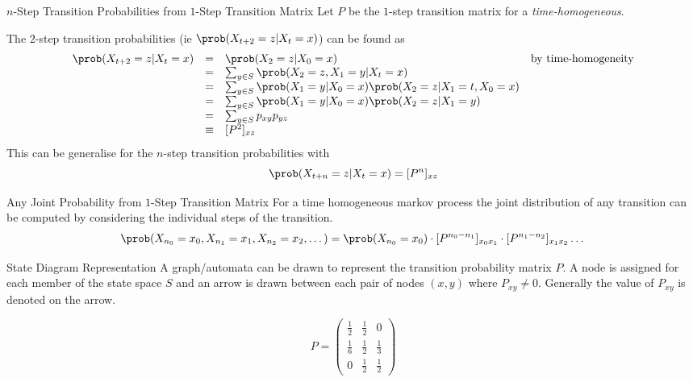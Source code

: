 \documentclass[11pt,a4paper]{article}
\begin{document}
\begin{proposition}{$n$-Step Transition Probabilities from $1$-Step Transition Matrix}
  Let $P$ be the $1$-step transition matrix for a \textit{time-homogeneous}.

  \par The $2$-step transition probabilities (ie $\prob(X_{t+2}=z|X_t=x)$) can be found as
  \[\begin{array}{rcll}
    \prob(X_{t+2}=z|X_t=x)&=&\prob(X_2=z|X_0=x)&\text{by time-homogeneity}\\
    &=&\sum_{y\in S}\prob(X_2=z,X_1=y|X_t=x)\\
    &=&\sum_{y\in S}\prob(X_1=y|X_0=x)\prob(X_2=z|X_1=t,X_0=x)\\
    &=&\sum_{y\in S}\prob(X_1=y|X_0=x)\prob(X_2=z|X_1=y)\\
    &=&\sum_{y\in S}p_{xy}p_{yz}\\
    &\equiv&[P^2]_{xz}
  \end{array}\]
  This can be generalise for the $n$-step transition probabilities with
  \[ \prob(X_{t+n}=z|X_t=x)=[P^n]_{xz} \]
\end{proposition}

\begin{proposition}{Any Joint Probability from $1$-Step Transition Matrix}
  For a time homogeneous markov process the joint distribution of any transition can be computed by considering the individual steps of the transition.
  \[ \prob(X_{n_0}=x_0,X_{n_1}=x_1,X_{n_2}=x_2,\dots)=\prob(X_{n_0}=x_0)\cdot[P^{n_0-n_1}]_{x_0x_1}\cdot[P^{n_1-n_2}]_{x_1x_2}\dots \]
\end{proposition}

\begin{proposition}{State Diagram Representation}
  A graph/automata can be drawn to represent the transition probability matrix $P$. A node is assigned for each member of the state space $S$ and an arrow is drawn between each pair of nodes $(x,y)$ where $P_{xy}\neq0$. Generally the value of $P_{xy}$ is denoted on the arrow.
  \begin{center}
    \[P=\begin{pmatrix}\frac{1}{2}&\frac{1}{2}&0\\\frac{1}{6}&\frac{1}{2}&\frac{1}{3}\\0&\frac{1}{2}&\frac{1}{2}\end{pmatrix}\]
  \end{center}
\end{proposition}
\end{document}
